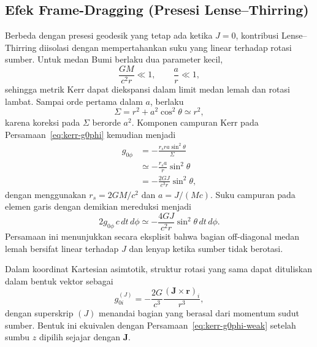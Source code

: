 \subsection{Efek Frame-Dragging (Presesi Lense--Thirring)}
\label{subsec:frame-dragging}

Berbeda dengan presesi geodesik yang tetap ada ketika $J=0$, kontribusi
Lense--Thirring diisolasi dengan mempertahankan suku yang linear terhadap
rotasi sumber. Untuk medan Bumi berlaku dua parameter kecil,
\begin{equation}
    \frac{GM}{c^2r}\ll1,
    \qquad
    \frac{a}{r}\ll1,
    \label{eq:lt-weak-parameters}
\end{equation}
sehingga metrik Kerr dapat diekspansi dalam limit medan lemah dan rotasi
lambat. Sampai orde pertama dalam $a$, berlaku
\begin{equation}
    \Sigma
    =r^2+a^2\cos^2\!\theta
    \simeq r^2,
\end{equation}
karena koreksi pada $\Sigma$ berorde $a^2$. Komponen campuran Kerr pada
Persamaan~\eqref{eq:kerr-g0phi} kemudian menjadi
\begin{equation}
\begin{split}
    g_{0\phi}
    &=-\frac{r_sra\sin^2\!\theta}{\Sigma}\\
    &\simeq-\frac{r_sa}{r}\sin^2\!\theta\\
    &=-\frac{2GJ}{c^3r}\sin^2\!\theta,
\end{split}
    \label{eq:kerr-g0phi-weak}
\end{equation}
dengan menggunakan $r_s=2GM/c^2$ dan $a=J/(Mc)$. Suku campuran pada
elemen garis dengan demikian mereduksi menjadi
\begin{equation}
    2g_{0\phi}\,c\,dt\,d\phi
    \simeq
    -\frac{4GJ}{c^2r}\sin^2\!\theta\,dt\,d\phi.
    \label{eq:kerr-cross-weak}
\end{equation}
Persamaan ini menunjukkan secara eksplisit bahwa bagian off-diagonal medan
lemah bersifat linear terhadap $J$ dan lenyap ketika sumber tidak
berotasi.

Dalam koordinat Kartesian asimtotik, struktur rotasi yang sama dapat
dituliskan dalam bentuk vektor sebagai
\begin{equation}
    g_{0i}^{(J)}
    =-\frac{2G}{c^3}
    \frac{\left(\mathbf{J}\times\mathbf{r}\right)_i}{r^3},
    \label{eq:weak-kerr-g0i}
\end{equation}
dengan superskrip $(J)$ menandai bagian yang berasal dari momentum sudut
sumber. Bentuk ini ekuivalen dengan
Persamaan~\eqref{eq:kerr-g0phi-weak} setelah sumbu $z$ dipilih sejajar
dengan $\mathbf{J}$.

